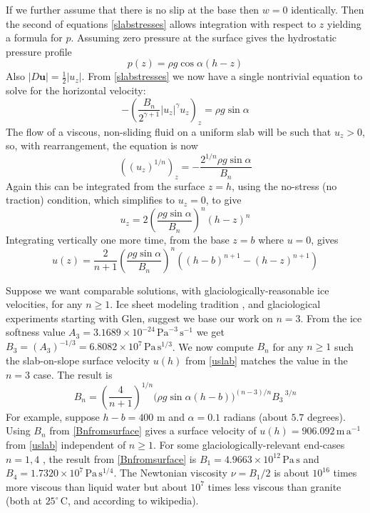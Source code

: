 \documentclass[letterpaper,final,12pt,reqno]{amsart}
\newcommand{\bu}{\mathbf{u}}
\begin{document}
If we further assume that there is no slip at the base then $w=0$ identically.  Then the second of equations \eqref{slabstresses} allows integration with respect to $z$ yielding a formula for $p$.  Assuming zero pressure at the surface gives the hydrostatic pressure profile
\begin{equation}
p(z) = \rho g\cos\alpha (h-z)  \label{pslab}
\end{equation}
Also $|D\bu| = \frac{1}{2} |u_z|$.  From \eqref{slabstresses} we now have a single nontrivial equation to solve for the horizontal velocity:
    $$- \left(\frac{B_n}{2^{\gamma+1}} |u_z|^\gamma u_z\right)_z = \rho g\sin\alpha$$
The flow of a viscous, non-sliding fluid on a uniform slab will be such that $u_z>0$, so, with rearrangement, the equation is now
    $$\left((u_z)^{1/n} \right)_z = - \frac{2^{1/n} \rho g\sin\alpha}{B_n}$$
Again this can be integrated from the surface $z=h$, using the no-stress (no traction) condition, which simplifies to $u_z=0$, to give
\begin{equation}
u_z = 2 \left(\frac{\rho g\sin\alpha}{B_n}\right)^n (h-z)^n  \label{uzslab}
\end{equation}
Integrating vertically one more time, from the base $z=b$ where $u=0$, gives
\begin{equation}
u(z) = \frac{2}{n+1} \left(\frac{\rho g\sin\alpha}{B_n}\right)^n \left((h-b)^{n+1} - (h-z)^{n+1}\right)  \label{uslab}
\end{equation}

Suppose we want comparable solutions, with glaciologically-reasonable ice velocities, for any $n\ge 1$.  Ice sheet modeling tradition \cite{GreveBlatter2009}, and glaciological experiments starting with Glen, suggest we base our work on $n=3$.  From the ice softness value $A_3 = 3.1689 \times 10^{-24} \,\text{Pa}^{-3}\,\text{s}^{-1}$ we get $B_3 = (A_3)^{-1/3} = 6.8082\times 10^7\,\text{Pa}\,\text{s}^{1/3}$.  We now compute $B_n$ for any $n\ge 1$ such the slab-on-slope surface velocity $u(h)$ from \eqref{uslab} matches the value in the $n=3$ case.  The result is
\begin{equation}
B_n = \left(\frac{4}{n+1}\right)^{1/n} \Big(\rho g \sin\alpha (h-b)\Big)^{(n-3)/n} {B_3\,}^{3/n}  \label{Bnfromsurface}
\end{equation}
For example, suppose $h-b=400$ m and $\alpha=0.1$ radians (about $5.7$ degrees).  Using $B_n$ from \eqref{Bnfromsurface} gives a surface velocity of $u(h)=906.092 \,\text{m}\,\text{a}^{-1}$ from \eqref{uslab} independent of $n\ge 1$.  For some glaciologically-relevant end-cases $n=1,4$ \cite{GoldsbyKohlstedt2001}, the result from \eqref{Bnfromsurface} is $B_1=4.9663\times 10^{12}\,\text{Pa}\,\text{s}$ and $B_4=1.7320\times 10^{7}\,\text{Pa}\,\text{s}^{1/4}$.  The Newtonian viscosity $\nu=B_1/2$ is about $10^{16}$ times more viscous than liquid water but about $10^7$ times less viscous than granite (both at $25^\circ \,\text{C}$, and according to wikipedia).
\end{document}
